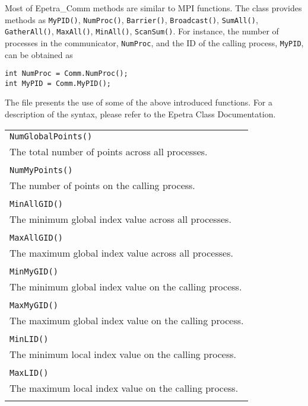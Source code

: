 Most of Epetra\_Comm methods are similar to MPI functions. The class
provides methods as \verb!MyPID()!, \verb!NumProc()!, \verb!Barrier()!,
\verb!Broadcast()!, \verb!SumAll()!, \verb!GatherAll()!,
\verb!MaxAll()!, \verb!MinAll()!, \verb!ScanSum()!.  For instance, the
number of processes in the communicator, \verb!NumProc!, and the ID of
the calling process, \verb!MyPID!, can be obtained as
\begin{verbatim}
int NumProc = Comm.NumProc();
int MyPID = Comm.MyPID();
\end{verbatim}

The file  presents the use of some of the above
introduced functions.  For a description of the syntax, please refer to
the Epetra Class Documentation.

\begin{table}
\begin{center}
\begin{tabular}{ | p{15cm} | }
\hline
\verb!NumGlobalPoints()!\\
The total number of points across all processes. \\
\\
\verb!NumMyPoints()!\\
The number of points on the calling process. \\
\\
 \verb!MinAllGID()! \\
The minimum global index value across all processes.  \\
\\
 \verb!MaxAllGID()! \\
The maximum global index value across all processes. \\
\\
 \verb!MinMyGID()!\\
The minimum global index value on the calling process. \\
\\
 \verb!MaxMyGID()! \\
The maximum global index value on the calling process. \\
\\
 \verb!MinLID()! \\
The minimum local index value on the calling process. \\
\\
 \verb!MaxLID()! \\
The maximum local index value on the calling process. \\
\\

\end{tabular}
\end{center}
\end{table}
